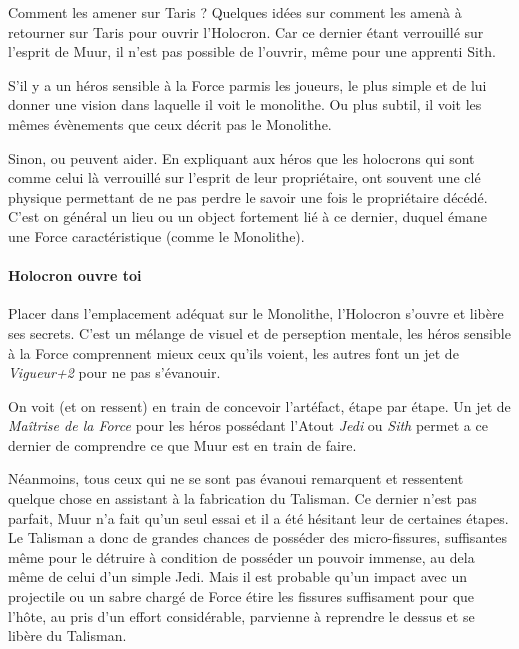 \newpage
\begin{paperbox}{Comment les amener sur Taris ?}
Quelques idées sur comment les amenà à retourner sur Taris pour ouvrir l’Holocron. Car ce dernier étant verrouillé sur l’esprit de Muur, il n’est pas possible de l’ouvrir, même pour une apprenti Sith.

    \begin{rebelist}
        \item S’il y a un héros sensible à la Force parmis les joueurs, le plus simple et de lui donner une vision dans laquelle il voit le monolithe. Ou plus subtil, il voit les mêmes évènements que ceux décrit pas le Monolithe.
        \item Sinon,  ou  peuvent aider. En expliquant aux héros que les holocrons qui sont comme celui là verrouillé sur l’esprit de leur propriétaire, ont souvent une clé physique permettant de ne pas perdre le savoir une fois le propriétaire décédé. C’est on général un lieu ou un object fortement lié à ce dernier, duquel émane une Force caractéristique (comme le Monolithe).
    \end{rebelist}
\end{paperbox}

\paragraph{Holocron ouvre toi}
Placer dans l’emplacement adéquat sur le Monolithe, l’Holocron s’ouvre et libère ses secrets. C’est un mélange de visuel et de perseption mentale, les héros sensible à la Force comprennent mieux ceux qu’ils voient, les autres font un jet de \textit{Vigueur+2} pour ne pas s’évanouir.

On voit (et on ressent)  en train de concevoir l’artéfact, étape par étape. Un jet de \textit{Maîtrise de la Force} pour les héros possédant l'Atout \textit{Jedi} ou \textit{Sith} permet a ce dernier de comprendre ce que Muur est en train de faire.

Néanmoins, tous ceux qui ne se sont pas évanoui remarquent et ressentent quelque chose en assistant à la fabrication du Talisman. Ce dernier n’est pas parfait, Muur n’a fait qu’un seul essai et il a été hésitant leur de certaines étapes. Le Talisman a donc de grandes chances de posséder des micro-fissures, suffisantes même pour le détruire à condition de posséder un pouvoir immense, au dela même de celui d’un simple Jedi. Mais il est probable qu’un impact avec un projectile ou un sabre chargé de Force étire les fissures suffisament pour que l’hôte, au pris d’un effort considérable, parvienne à reprendre le dessus et se libère du Talisman. 

